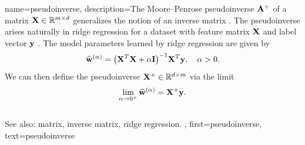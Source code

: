 

{name={pseudoinverse},
  description={The Moore–Penrose pseudoinverse ${\bf A}^{+}$ 
 	of a matrix ${\bf X} \in \mathbb{R}^{m \times d}$ 
	generalizes the notion of an inverse matrix \cite{GolubVanLoanBook}. 
	The pseudoinverse arises naturally in ridge regression for a 
	dataset with feature matrix ${\bf X}$ and label vector 
	${\bf y}$ \cite[Ch.\ 3]{hastie01statisticallearning}. 
	The model parameters learned by ridge regression 
  	are given by
  	\[
  	\widehat{{\bf w}}^{(\alpha)}  = \big({\bf X}^{T} {\bf X} + \alpha \mathbf{I} \big)^{-1} {\bf X}^{T} {\bf y}, \quad \alpha > 0.
  	\]
  	We can then define the pseudoinverse ${\bf X}^{+} \in \mathbb{R}^{d \times m}$ via 
  	the limit \cite[Ch. 3]{benisrael2003generalized}
  	\[
  	\lim_{\alpha \to 0^+} \widehat{{\bf w}}^{(\alpha)} = {\bf X}^+ {\bf y}.
  	\]
	\\
	See also: matrix, inverse matrix, ridge regression. },
 first={pseudoinverse},
 text={pseudoinverse}
}


